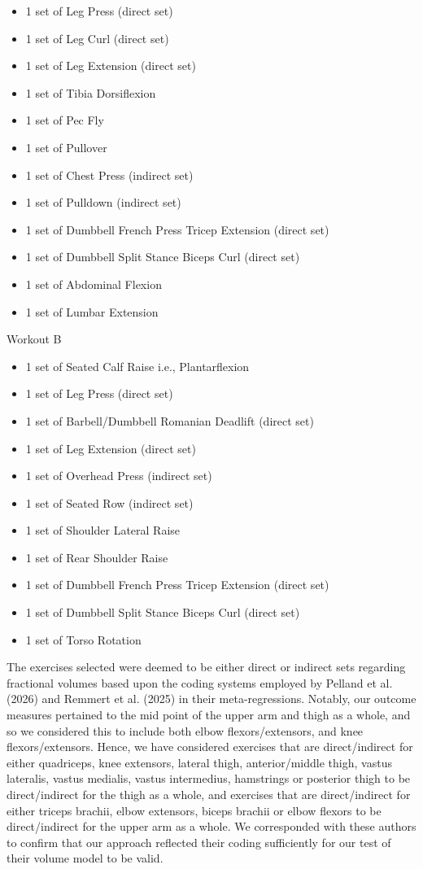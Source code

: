 \documentclass[
]{article}
\providecommand{\tightlist}{%
  \setlength{\itemsep}{0pt}\setlength{\parskip}{0pt}}
\begin{document}
\begin{itemize}
\tightlist
\item
  1 set of Leg Press (direct set)
\item
  1 set of Leg Curl (direct set)
\item
  1 set of Leg Extension (direct set)
\item
  1 set of Tibia Dorsiflexion
\item
  1 set of Pec Fly
\item
  1 set of Pullover
\item
  1 set of Chest Press (indirect set)
\item
  1 set of Pulldown (indirect set)
\item
  1 set of Dumbbell French Press Tricep Extension (direct set)
\item
  1 set of Dumbbell Split Stance Biceps Curl (direct set)
\item
  1 set of Abdominal Flexion
\item
  1 set of Lumbar Extension
\end{itemize}

Workout B

\begin{itemize}
\tightlist
\item
  1 set of Seated Calf Raise i.e., Plantarflexion
\item
  1 set of Leg Press (direct set)
\item
  1 set of Barbell/Dumbbell Romanian Deadlift (direct set)
\item
  1 set of Leg Extension (direct set)
\item
  1 set of Overhead Press (indirect set)
\item
  1 set of Seated Row (indirect set)
\item
  1 set of Shoulder Lateral Raise
\item
  1 set of Rear Shoulder Raise
\item
  1 set of Dumbbell French Press Tricep Extension (direct set)
\item
  1 set of Dumbbell Split Stance Biceps Curl (direct set)
\item
  1 set of Torso Rotation
\end{itemize}

The exercises selected were deemed to be either direct or indirect sets
regarding fractional volumes based upon the coding systems employed by
Pelland et al. (2026) and Remmert et al. (2025) in their
meta-regressions. Notably, our outcome measures pertained to the mid
point of the upper arm and thigh as a whole, and so we considered this
to include both elbow flexors/extensors, and knee flexors/extensors.
Hence, we have considered exercises that are direct/indirect for either
quadriceps, knee extensors, lateral thigh, anterior/middle thigh, vastus
lateralis, vastus medialis, vastus intermedius, hamstrings or posterior
thigh to be direct/indirect for the thigh as a whole, and exercises that
are direct/indirect for either triceps brachii, elbow extensors, biceps
brachii or elbow flexors to be direct/indirect for the upper arm as a
whole. We corresponded with these authors to confirm that our approach
reflected their coding sufficiently for our test of their volume model
to be valid.
\end{document}
